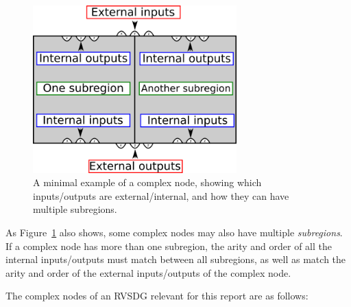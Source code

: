\begin{figure}[H]
	\centering
	\includegraphics[width=0.7\textwidth]{figures/complex_node_mapping_ex}
	\caption{A minimal example of a complex node, showing which inputs/outputs
are external/internal, and how they can have multiple subregions.}
	\label{fig:complex_node_mapping_ex}
\end{figure}

As Figure~\ref{fig:complex_node_mapping_ex} also shows, some complex nodes may
also have multiple \textit{subregions}. If a complex node has more than one
subregion, the arity and order of all the internal inputs/outputs must match
between all subregions, as well as match the arity and order of the external
inputs/outputs of the complex node.

The complex nodes of an RVSDG relevant for this report are as follows:

